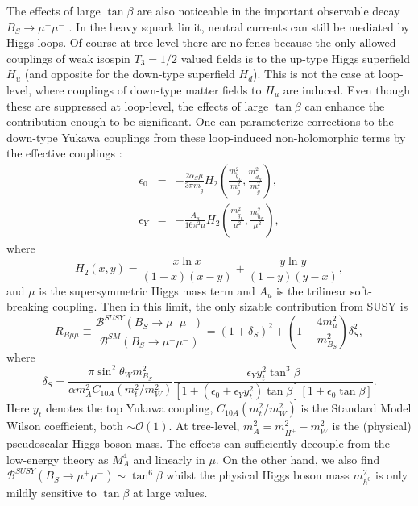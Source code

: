 \begin{enumerate}
\begin{enumerate*}
The effects of large $\tan \beta$ are also noticeable in the important observable decay $B_{S} \rightarrow \mu^+ \mu^-$ \cite{RN671}. In the heavy squark limit, neutral currents can still be mediated by Higgs-loops. Of course at tree-level there are no \acrshort{fcnc}s because the only allowed couplings of weak isospin $T_{3}=1/2$ valued fields is to the up-type Higgs superfield $H_u$ (and opposite for the down-type superfield $H_d$). This is not the case at loop-level, where couplings of down-type matter fields to $H_u$ are induced. Even though these are suppressed at loop-level, the effects of large $\tan \beta$ can enhance the contribution enough to be significant. One can parameterize corrections to the down-type Yukawa couplings from these loop-induced non-holomorphic terms by the effective couplings \cite{RN588,RN585,RN582}:
\begin{eqnarray}
\epsilon_{0}&=&-\frac{2\alpha_{S}\mu}{3\pi m_{\tilde{g}}}H_{2}\left(\frac{m^2_{\tilde{q}_L}}{m^2_{\tilde{g}}},\frac{m^2_{\tilde{d}_R}}{m^2_{\tilde{g}}}\right), \\
\epsilon_{Y}&=&-\frac{A_{u}}{16\pi^2 \mu}H_{2}\left(\frac{m^2_{\tilde{q}_L}}{\mu^2},\frac{m^2_{\tilde{u}_R}}{\mu^2}\right),
\end{eqnarray}
where
\begin{equation}
H_{2}(x,y)=\frac{x \ln x}{(1-x)(x-y)}+\frac{y \ln y}{(1-y)(y-x)},
\end{equation}
and $\mu$ is the supersymmetric Higgs mass term and $A_u$ is the trilinear soft-breaking coupling. Then in this limit, the only sizable contribution from SUSY is
\begin{equation}
R_{B\mu\mu} \equiv \frac{\mathcal{B}^{SUSY}(B_{S} \rightarrow \mu^+ \mu^-)}{\mathcal{B}^{SM}(B_{S} \rightarrow \mu^+ \mu^-)}=(1+\delta_S)^2+ \left( 1-\frac{4m^2_{\mu}}{m^2_{B_{S}}}\right)\delta^2_{S},
\end{equation}
where
\begin{equation}
\delta_{S}=\frac{\pi \sin^2 \theta_W m^2_{B_S}}{\alpha m^2_{A} C_{10A}(m^2_{t}/m^2_{W})}\frac{\epsilon_{Y}y^2_{t}\tan^3\beta}{[1+(\epsilon_{0}+\epsilon_{Y}y^2_{t})\tan \beta][1+\epsilon_{0}\tan \beta]}.
\end{equation}
Here $y_t$ denotes the top Yukawa coupling, $C_{10A}(m^2_{t}/m^2_{W})$ is the Standard Model Wilson coefficient, both $\sim \mathcal{O}(1)$. At tree-level, $m^2_{A}=m^2_{H^{\pm}}-m^2_{W}$ is the (physical) pseudoscalar Higgs boson mass. The effects can sufficiently decouple from the low-energy theory as $M^4_{A}$ and linearly in $\mu$. On the other hand, we also find $\mathcal{B}^{SUSY}(B_{S} \rightarrow \mu^+ \mu^-) \sim \tan^6 \beta$ whilst the physical Higgs boson mass $m^2_{h^0}$ is only mildly sensitive to $\tan \beta$ at large values.


\end{enumerate*}
\end{enumerate}
